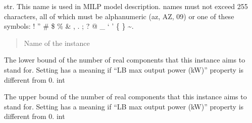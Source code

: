 \documentclass[letterpaper,10pt,english]{sphinxmanual}
\begin{document}
\begin{fulllineitems}
\begin{fulllineitems}
\label{\detokenize{generated/tamos.production.Pump:tamos.production.Pump.name}}
\pysigstartsignatures
{}
\pysigstopsignatures
\sphinxAtStartPar
str.
This name is used in MILP model description.
names must not exceed 255 characters,
all of which must be alphanumeric (a\sphinxhyphen{}z, A\sphinxhyphen{}Z, 0\sphinxhyphen{}9) or one of these symbols:
! ” \# \$ \% \& , . ; ? @ \_ ‘ ’ \{ \} \textasciitilde{}.
\begin{quote}\begin{description}
\sphinxAtStartPar
Name of the instance

\end{description}\end{quote}

\end{fulllineitems}


\begin{fulllineitems}
\label{\detokenize{generated/tamos.production.Pump:tamos.production.Pump.units_number_lb}}
\pysigstartsignatures
{}
\pysigstopsignatures
\sphinxAtStartPar
The lower bound of the number of real components that this instance aims to stand for.
Setting  has a meaning if “LB max output power (kW)” property is different from 0.
int

\end{fulllineitems}


\begin{fulllineitems}
\label{\detokenize{generated/tamos.production.Pump:tamos.production.Pump.units_number_ub}}
\pysigstartsignatures
{}
\pysigstopsignatures
\sphinxAtStartPar
The upper bound of the number of real components that this instance aims to stand for.
Setting  has a meaning if “LB max output power (kW)” property is different from 0.
int


\end{fulllineitems}
\end{fulllineitems}
\end{document}
